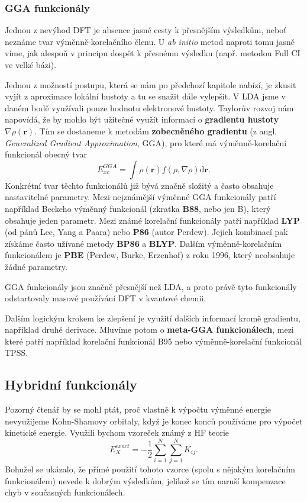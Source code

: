 \subsubsection{GGA funkcionály}
Jednou z nevýhod DFT je absence jasné cesty k přesnějším výsledkům, neboť neznáme tvar výměnně-korelačního členu. U \textit{ab initio} metod naproti tomu jasně víme, jak alespoň v principu dospět k přesnému výsledku (např. metodou Full CI ve velké bázi).

Jednou z možností postupu, která se nám po předchozí kapitole nabízí, je zkusit vyjít z aproximace lokální hustoty a tu se snažit dále vylepšit. V LDA jsme v daném bodě využívali pouze hodnotu elektronové hustoty. Taylorův rozvoj nám napovídá, že by mohlo být užitečné využít informaci o \textbf{gradientu hustoty} $\nabla\rho(\textbf{r})$. 
Tím se dostaneme k metodám \textbf{zobecněného gradientu} (z angl. \textit{Generalized Gradient Approximation}, GGA), pro které má výměnně-korelační funkcionál obecný tvar
\begin{equation}
E_{xc}^{GGA}=\int \rho(\textbf{r})f(\rho,\nabla\rho) \mathrm{d}\textbf{r} .
\end{equation}
Konkrétní tvar těchto funkcionálů již bývá značně složitý a často obsahuje nastavitelné parametry. Mezi nejznámější výměnné GGA funkcionály patří například Beckeho výměnný funkcionál (zkratka \textbf{B88}, nebo jen B), který obsahuje jeden parametr. Mezi známé korelační funkcionály patří například \textbf{LYP} (od pánů Lee, Yang a Paara) nebo \textbf{P86} (autor Perdew). Jejich kombinací pak získáme často užívané metody \textbf{BP86} a \textbf{BLYP}. Dalším výměnně-korelačním funkcionálem je \textbf{PBE} (Perdew, Burke, Erzenhof) z roku 1996, který neobsahuje žádné parametry.

GGA funkcionály jsou značně přesnější než LDA, a proto právě tyto funkcionály odstartovaly masové používání DFT v kvantové chemii.

Dalším logickým krokem ke zlepšení je využití dalších informací kromě gradientu, například druhé derivace. Mluvíme potom o \textbf{meta-GGA funkcionálech}, mezi které patří například korelační funkcionál B95 nebo výměnně-korelační funkcionál TPSS.

\subsection{Hybridní funkcionály}
Pozorný čtenář by se mohl ptát, proč vlastně k výpočtu výměnné energie nevyužijeme Kohn-Shamovy orbitaly, když je konec konců používáme pro výpočet kinetické energie. Využili bychom vzoreček známý z HF teorie 
\begin{equation}
E_X^{exact}=-\frac{1}{2}\sum_{i=1}^N\sum_{j=1}^N K_{ij} . 
\label{rov:dft:exHF}
\end{equation}
Bohužel se ukázalo, že přímé použití tohoto vzorce (spolu s nějakým korelačním funkcionálem) nevede k dobrým výsledkům, jelikož se tím naruší kompenzace chyb v současných funkcionálech.

